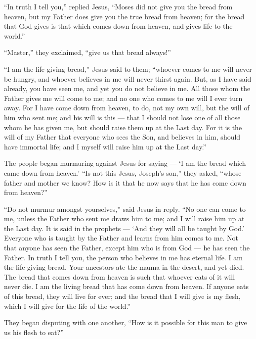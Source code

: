  ``In truth I tell you,'' replied Jesus, ``Moses did not
give you the bread from heaven, but my Father does give you the true
bread from heaven;  for the bread that God gives is that
which comes down from heaven, and gives life to the world.''

 ``Master,'' they exclaimed, ``give us that bread always!''

 ``I am the life-giving bread,'' Jesus said to them;
``whoever comes to me will never be hungry, and whoever believes in me
will never thirst again.  But, as I have said already, you
have seen me, and yet you do not believe in me.  All those
whom the Father gives me will come to me; and no one who comes to me
will I ever turn away.  For I have come down from heaven,
to do, not my own will, but the will of him who sent me; 
and his will is this --- that I should not lose one of all those whom he
has given me, but should raise them up at the Last day. 
For it is the will of my Father that everyone who sees the Son, and
believes in him, should have immortal life; and I myself will raise him
up at the Last day.''

 The people began murmuring against Jesus for saying --- `I
am the bread which came down from heaven.'  ``Is not this
Jesus, Joseph's son,'' they asked, ``whose father and mother we know?
How is it that he now says that he has come down from heaven?''

 ``Do not murmur amongst yourselves,'' said Jesus in reply.
 ``No one can come to me, unless the Father who sent me
draws him to me; and I will raise him up at the Last day. 
It is said in the prophets --- `And they will all be taught by God.'
Everyone who is taught by the Father and learns from him comes to me.
 Not that anyone has seen the Father, except him who is
from God --- he has seen the Father.  In truth I tell you,
the person who believes in me has eternal life.  I am the
life-giving bread.  Your ancestors ate the manna in the
desert, and yet died.  The bread that comes down from
heaven is such that whoever eats of it will never die.  I
am the living bread that has come down from heaven. If anyone eats of
this bread, they will live for ever; and the bread that I will give is
my flesh, which I will give for the life of the world.''

 They began disputing with one another, ``How is it
possible for this man to give us his flesh to eat?''

